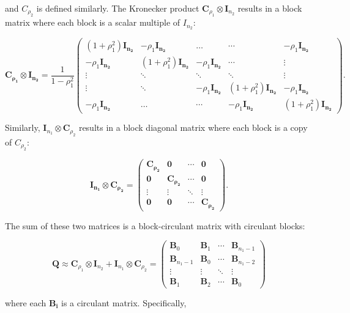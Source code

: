 \documentclass[
  letterpaper,
  DIV=11,
  numbers=noendperiod]{scrartcl}
\begin{document}
and \(C_{\rho_2}\) is defined similarly. The Kronecker product
\(\mathbf C_{\rho_1} \otimes \mathbf I_{n_2}\) results in a block matrix
where each block is a scalar multiple of \(I_{n_2}\):

\[
\mathbf{C_{\rho_1}} \otimes \mathbf{I_{n_2}} = \frac{1}{1-\rho_1^2}
\begin{pmatrix}
(1+\rho_1^2)\mathbf{I_{n_2}} & -\rho_1\mathbf{I_{n_2}} & \dots & \cdots & -\rho_1\mathbf{I_{n_2}} \\
-\rho_1\mathbf{I_{n_2}} & (1+\rho_1^2)\mathbf{I_{n_2}} & -\rho_1 \mathbf{I_{n_2}} & \cdots & \vdots  \\
\vdots & \ddots & \ddots & \ddots & \vdots \\
\vdots & \ddots & -\rho_1\mathbf{I_{n_2}} & (1+\rho_1^2)\mathbf{I_{n_2}} & -\rho_1 \mathbf{I_{n_2}}  \\
-\rho_1\mathbf{I_{n_2}} & \dots & \cdots & -\rho_1 \mathbf{I_{n_2}} & (1+\rho_1^2)\mathbf{I_{n_2}}
\end{pmatrix}.
\]

Similarly, \(\mathbf I_{n_1} \otimes \mathbf C_{\rho_2}\) results in a
block diagonal matrix where each block is a copy of \(C_{\rho_2}\):

\[
\mathbf{I_{n_1}} \otimes \mathbf{C_{\rho_2}} = 
\begin{pmatrix}
\mathbf{C_{\rho_2}} & \mathbf{0} & \cdots & \mathbf{0} \\
\mathbf{0} & \mathbf{C_{\rho_2}} & \cdots & \mathbf{0} \\
\vdots & \vdots & \ddots & \vdots \\
\mathbf{0} & \mathbf{0} & \cdots & \mathbf{C_{\rho_2}}
\end{pmatrix}.
\]

The sum of these two matrices is a block-circulant matrix with circulant
blocks:

\[
\mathbf{Q} \approx \mathbf C_{\rho_1} \otimes \mathbf I_{n_2} + \mathbf I_{n_1} \otimes \mathbf C_{\rho_2} = 
\begin{pmatrix}
\mathbf{B}_0 & \mathbf{B}_1 & \cdots & \mathbf{B}_{n_1-1} \\
\mathbf{B}_{n_1-1} & \mathbf{B}_0 & \cdots & \mathbf{B}_{n_1-2} \\
\vdots & \vdots & \ddots & \vdots \\
\mathbf{B}_1 & \mathbf{B}_2 & \cdots & \mathbf{B}_0
\end{pmatrix}
\]

where each \(\mathbf{B_i}\) is a circulant matrix. Specifically,
\end{document}

